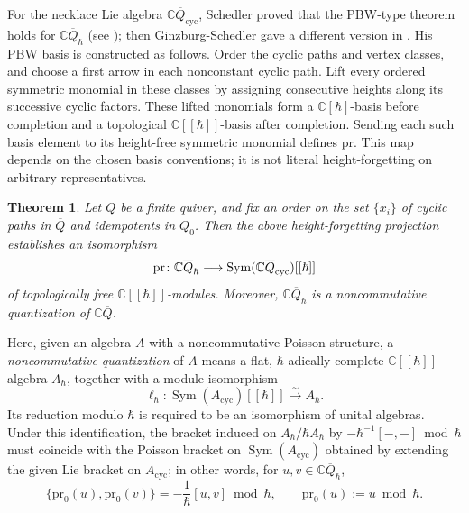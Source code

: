 \documentclass[11pt,reqno]{amsart}
\newtheorem{theorem}{Theorem}[section]
\theoremstyle{definition}
\newcommand{\bbC}{\mathbb{C}}
\newcommand{\QQ}{\mathbb{C} \overline{Q}}
\newcommand{\qneck}{{\mathbb{C} \overline{Q}}_{\hbar}}
\newcommand{\cyc}{\mathrm{cyc}}
\newcommand{\Sym}{\operatorname{Sym}}
\newcommand{\pr}{\mathrm{pr}}
\begin{document}
For the necklace Lie algebra \(\QQ_\cyc\),
Schedler proved that the PBW-type theorem holds for \(\qneck\) (see \cite[Section 4]{Sch2005}); then Ginzburg-Schedler gave a different version in \cite{GinSch2006}.
His PBW basis is constructed as follows.
Order the cyclic paths and vertex classes, and choose a first arrow in
each nonconstant cyclic path.  Lift every ordered symmetric monomial
in these classes by assigning consecutive heights along its successive
cyclic factors.  These lifted monomials form a
\(\bbC[\hbar]\)-basis before completion and a topological
\(\bbC[[\hbar]]\)-basis after completion.
Sending each such basis element to its height-free symmetric monomial
defines \(\pr\).  This map depends on the chosen basis conventions;
it is not literal height-forgetting on arbitrary representatives.
\begin{theorem}\cite[Theorem 4.1]{Sch2005}
\label{thm: schedler's}
Let \(Q\) be a finite quiver, and fix an order on the set \(\{x_i\}\) of cyclic paths in \(\overline Q\) and idempotents in \(Q_0\).
Then the above height-forgetting projection
establishes an isomorphism
\[
{\rm pr}\colon\qneck\longrightarrow \Sym(\QQ_\cyc)[[\hbar]]
\]
of topologically free  \(\mathbb{C}[[\hbar]]\)-modules.
Moreover, \(\qneck\) is a noncommutative quantization of \(\QQ\).
\end{theorem}



Here, given an algebra \(A\) with a noncommutative Poisson structure, a \emph{noncommutative quantization} of \(A\) means a flat, \(\hbar\)-adically complete \(\bbC[[\hbar]]\)-algebra \(A_\hbar\), together with a module isomorphism
\[
\ell_\hbar:\Sym(A_\cyc)[[\hbar]]\xrightarrow{\sim}A_\hbar.
\]
Its reduction modulo \(\hbar\) is required to be an isomorphism of unital algebras. Under this identification, the bracket induced on \(A_\hbar/\hbar A_\hbar\) by \(-\hbar^{-1}[-,-]\bmod\hbar\) must coincide with the Poisson bracket on \(\Sym(A_\cyc)\) obtained by extending the given Lie bracket on \(A_\cyc\);
in other words, for \(u,v\in\qneck\),
\begin{equation}\label{nc  pic}
\{\pr_0(u),\pr_0(v)\}
=-\frac{1}{\hbar}[u,v]\bmod\hbar,
\qquad
\pr_0(u):=u\bmod\hbar.
\end{equation}
\end{document}
